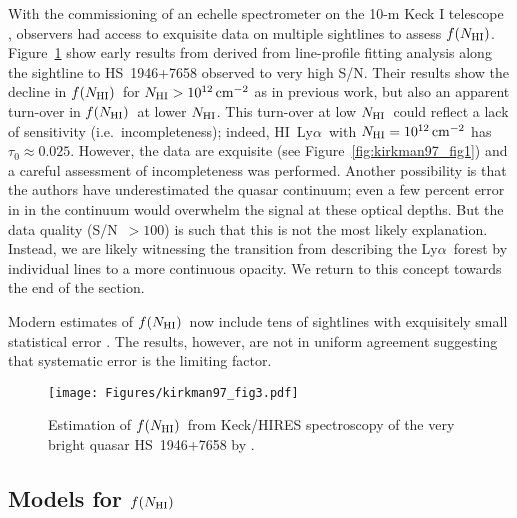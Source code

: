 \documentclass[graybox]{svmult}
\newcommand{\HI}{H{\sc I}}
\def\lya{Ly$\alpha$}
\newcommand{\mnhi}{N_{\rm HI}}
\newcommand{\nhi}{$\mnhi$}
\def\cm#1{\, {\rm cm^{#1}}}
\def\mfnhi{f(\mnhi)}
\def\fnhi{$\mfnhi$}
\begin{document}
With the commissioning of an echelle spectrometer on
the 10-m Keck I telescope \cite[HIRES]{vogt94}, 
observers had access to exquisite data on multiple 
sightlines to assess \fnhi.  Figure~\ref{fig:fN_kt97}
show early results from \cite{kt97} derived from
line-profile fitting analysis along the sightline
to HS~1946+7658 observed to very high S/N.  
Their results show the decline in \fnhi\ for
$\mnhi > 10^{12} \cm{-2}$ as in previous work, but 
also an apparent turn-over in \fnhi\ at lower \nhi. 
This turn-over at low \nhi\ could reflect 
a lack of sensitivity 
(i.e.\ incompleteness); indeed, \HI\ \lya\
with  $\mnhi = 10^{12} \cm{-2}$ has $\tau_0 \approx 0.025$.
However, the data are exquisite (see Figure~\ref{fig:kirkman97_fig1})
and a careful assessment of incompleteness was performed.
Another possibility is that the authors have underestimated the
quasar continuum; even a few percent error in
in the continuum would overwhelm the signal at these
optical depths.  But the data quality (S/N~$>100$)
is such that this is not the most likely explanation.
Instead, we are likely witnessing the transition from
describing the \lya\ forest by individual lines to 
a more continuous opacity.  We return to this concept
towards the end of the section.

Modern estimates of \fnhi\ now include tens of sightlines
with exquisitely small statistical error \cite[]{rudie13,kim13}.
The results, however, are not in uniform agreement suggesting
that systematic error is the limiting factor.



%
\begin{figure}[b]
\sidecaption
\texttt{[image: Figures/kirkman97\_fig3.pdf]}
%
%
\caption{Estimation of \fnhi\ from Keck/HIRES spectroscopy of the
very bright quasar HS~1946+7658 by \cite{kt97}.
}
\label{fig:fN_kt97}       %
\end{figure}

\subsection{Models for \fnhi}
\label{sec:max_fN}
\end{document}
